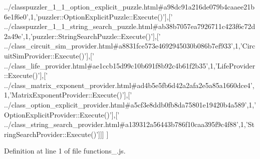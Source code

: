 \begin{DoxyCode}
{      ../classpuzzler\_1\_1\_option\_explicit\_puzzle.html#a98dc91a216de079b4caaee21b6e1f6e0'},1,\textcolor{stringliteral}{'puzzler::OptionExplicitPuzzle::Execute()'}],[\textcolor{stringliteral}{'
      ../classpuzzler\_1\_1\_string\_search\_puzzle.html#ab38b7057ea7926711c423f6c72d2a49e'},1,\textcolor{stringliteral}{'puzzler::StringSearchPuzzle::Execute()'}],[\textcolor{stringliteral}{'
      ../class\_circuit\_sim\_provider.html#a8831fce573e4692945030b086b7ef933'},1,\textcolor{stringliteral}{'CircuitSimProvider::Execute()'}],[\textcolor{stringliteral}{'
      ../class\_life\_provider.html#ae1ccb15d99c10b691f8b92c4b61f2b35'},1,\textcolor{stringliteral}{'LifeProvider::Execute()'}],[\textcolor{stringliteral}{'
      ../class\_matrix\_exponent\_provider.html#ad4b5e5fb6d42a2afa2e5a85a1660dce4'},1,\textcolor{stringliteral}{'MatrixExponentProvider::Execute()'}],[\textcolor{stringliteral}{'
      ../class\_option\_explicit\_provider.html#a5cf3e8ddb0fb8da75801e19420b4a589'},1,\textcolor{stringliteral}{'OptionExplicitProvider::Execute()'}],[\textcolor{stringliteral}{'
      ../class\_string\_search\_provider.html#a139312a56443b786f10caa395f9c4f88'},1,\textcolor{stringliteral}{'StringSearchProvider::Execute()'}]]]
]
\end{DoxyCode}


Definition at line 1 of file functions\+\_.\+js.

